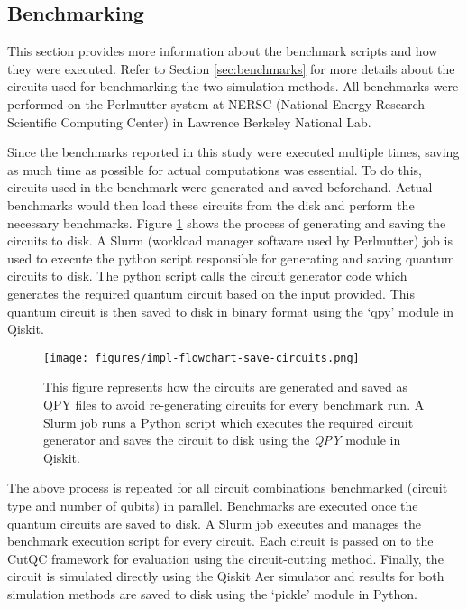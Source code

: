\subsection{Benchmarking}
\label{sec:impl/benchmarks}

This section provides more information about the benchmark scripts and how they were executed. Refer to Section \ref{sec:benchmarks} for more details about the circuits used for benchmarking the two simulation methods. All benchmarks were performed on the Perlmutter \cite{perlmutter} system at NERSC (National Energy Research Scientific Computing Center) in Lawrence Berkeley National Lab.  

Since the benchmarks reported in this study were executed multiple times, saving as much time as possible for actual computations was essential. To do this, circuits used in the benchmark were generated and saved beforehand. Actual benchmarks would then load these circuits from the disk and perform the necessary benchmarks. Figure \ref{fig:impl/flow-save-circ} shows the process of generating and saving the circuits to disk. A Slurm \cite{slurm} (workload manager software used by Perlmutter) job is used to execute the python script responsible for generating and saving quantum circuits to disk. The python script calls the circuit generator code which generates the required quantum circuit based on the input provided. This quantum circuit is then saved to disk in binary format using the `qpy' module in Qiskit.

\begin{figure}[htbp]
    \centering
    \texttt{[image: figures/impl-flowchart-save-circuits.png]}
    \caption{ This figure represents how the circuits are generated and saved as QPY files to avoid re-generating circuits for every benchmark run. A Slurm job runs a Python script which executes the required circuit generator and saves the circuit to disk using the \textit{QPY} module in Qiskit. }
    \label{fig:impl/flow-save-circ}
\end{figure}

The above process is repeated for all circuit combinations benchmarked (circuit type and number of qubits) in parallel. Benchmarks are executed once the quantum circuits are saved to disk. A Slurm job executes and manages the benchmark execution script for every circuit. Each circuit is passed on to the CutQC framework for evaluation using the circuit-cutting method. Finally, the circuit is simulated directly using the Qiskit Aer simulator and results for both simulation methods are saved to disk using the `pickle' module in Python.

